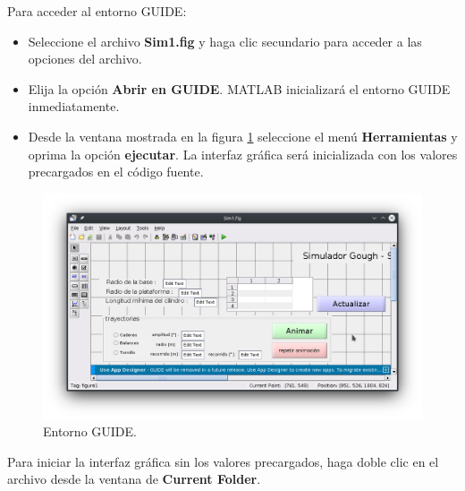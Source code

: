 Para acceder al entorno GUIDE: 
\begin{itemize}
 \item  Seleccione el archivo \textbf{Sim1.fig} y haga clic secundario para 
acceder a las opciones del archivo. 
\item Elija la opción \textbf{Abrir en GUIDE}. 
MATLAB inicializará el entorno GUIDE inmediatamente. 
\item Desde la ventana mostrada en la 
figura \ref{fig: GUIDE} seleccione el menú 
\textbf{Herramientas} y oprima la opción \textbf{ejecutar}.
La interfaz gráfica será inicializada con los valores
precargados en el código fuente.
\end{itemize}


\begin{figure}[h]
 \centering
 \includegraphics[scale=0.4]{img/GUI_GUIDE_window.PNG}
 \caption{Entorno GUIDE.}
 \label{fig: GUIDE}
\end{figure}


Para iniciar la interfaz gráfica sin los valores 
precargados, haga doble clic en el archivo desde la 
ventana de \textbf{Current Folder}.


% 

